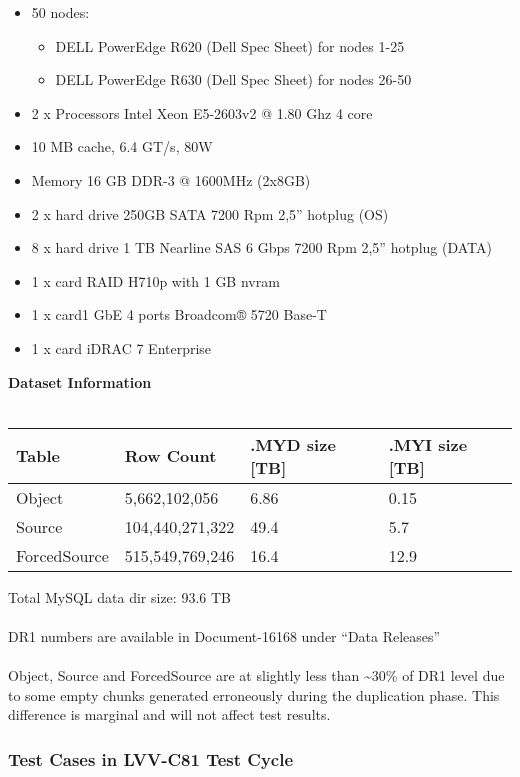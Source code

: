 \documentclass[DM,lsstdraft,STR,toc]{lsstdoc}
\providecommand{\tightlist}{
  \setlength{\itemsep}{0pt}\setlength{\parskip}{0pt}}
\begin{document}
\begin{itemize}
\tightlist
\item
  50 nodes:

  \begin{itemize}
  \tightlist
  \item
    DELL PowerEdge R620 (Dell Spec Sheet) for nodes 1-25~
  \item
    DELL PowerEdge R630 (Dell Spec Sheet) for nodes 26-50
  \end{itemize}
\item
  2 x Processors Intel Xeon E5-2603v2 @ 1.80 Ghz 4 core
\item
  10 MB cache, 6.4 GT/s, 80W
\item
  Memory 16 GB DDR-3 @ 1600MHz (2x8GB)
\item
  2 x hard drive 250GB SATA 7200 Rpm 2,5'' hotplug (OS)
\item
  8 x hard drive 1 TB Nearline SAS 6 Gbps 7200 Rpm 2,5'' hotplug (DATA)
\item
  1 x card RAID H710p with 1 GB nvram
\item
  1 x card1 GbE 4 ports Broadcom® 5720 Base-T
\item
  1 x card iDRAC 7 Enterprise
\end{itemize}

\textbf{Dataset Information\\
}~\\

\begin{longtable}[]{@{}llll@{}}
\toprule
Table & Row Count & .MYD size {[}TB{]} & .MYI size
{[}TB{]}\tabularnewline
\midrule
\endhead
Object & 5,662,102,056 & 6.86 & 0.15\tabularnewline
Source & 104,440,271,322 & 49.4 & 5.7\tabularnewline
ForcedSource & 515,549,769,246 & 16.4 & 12.9\tabularnewline
\bottomrule
\end{longtable}

Total MySQL data dir size: 93.6 TB\\
~\\
DR1 numbers are available in Document-16168 under ``Data Releases''\\
~\\
Object, Source and ForcedSource are at slightly less than
\textasciitilde{}30\% of DR1 level due to some empty chunks generated
erroneously during the duplication phase. This difference is marginal
and will not affect test results.


  \subsubsection{Test Cases in LVV-C81 Test Cycle}
\end{document}
